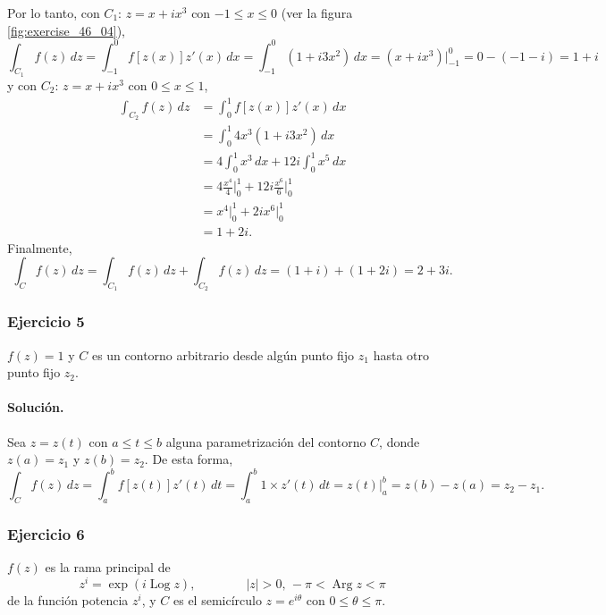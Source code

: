 \documentclass[a4paper]{report}
\DeclareMathOperator{\Arg}{Arg}
\DeclareMathOperator{\Log}{Log}
\begin{document}
Por lo tanto, con \(C_1:\,z=x+ix^3\) con \(-1\leq x\leq0\) (ver la figura \ref{fig:exercise_46_04}),
\[
 \int_{C_1}f(z)\,dz=\int_{-1}^{0}f[z(x)]z'(x)\,dx=\int_{-1}^{0}(1+i3x^2)\,dx=(x+ix^3)\bigg|_{-1}^{0}=0-(-1-i)=1+i
\]
y con \(C_2:\,z=x+ix^3\) con \(0\leq x\leq1\),
\begin{align*}
 \int_{C_2}f(z)\,dz&=\int_{0}^{1}f[z(x)]z'(x)\,dx\\
   &=\int_{0}^{1}4x^3(1+i3x^2)\,dx\\ 
   &=4\int_{0}^{1}x^3\,dx+12i\int_{0}^{1}x^5\,dx\\
   &=4\frac{x^4}{4}\bigg|_{0}^{1}+12i\frac{x^6}{6}\bigg|_{0}^{1}\\
   &=x^4\bigg|_{0}^{1}+2ix^6\bigg|_{0}^{1}\\
   &=1+2i.
\end{align*}
Finalmente,
\[
 \int_C f(z)\,dz=\int_{C_1}f(z)\,dz+\int_{C_2}f(z)\,dz=(1+i)+(1+2i)=2+3i.
\]

\subsubsection{Ejercicio 5}

\(f(z)=1\) y \(C\) es un contorno arbitrario desde algún punto fijo \(z_1\) hasta otro punto fijo \(z_2\).

\paragraph{Solución.} Sea \(z=z(t)\) con \(a\leq t\leq b\) alguna parametrización del contorno \(C\), donde \(z(a)=z_1\) y \(z(b)=z_2\). De esta forma,
\[
 \int_Cf(z)\,dz=\int_a^bf[z(t)]z'(t)\,dt=\int_a^b1\times z'(t)\,dt=z(t)\bigg|_a^b=z(b)-z(a)=z_2-z_1.
\]

\subsubsection{Ejercicio 6}

\(f(z)\) es la rama principal de
\[
 z^i=\exp(i\Log z),
 \qquad\qquad
 |z|>0,\,-\pi<\Arg z<\pi
\]
de la función potencia \(z^i\), y \(C\) es el semicírculo \(z=e^{i\theta}\) con \(0\leq\theta\leq\pi\).
\end{document}
